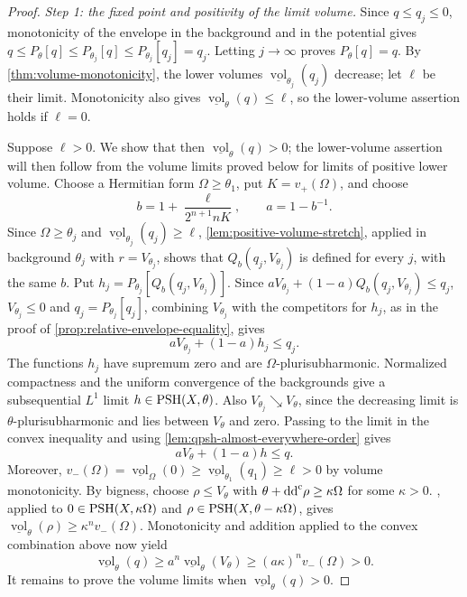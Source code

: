 \begin{proof}
\emph{Step 1: the fixed point and positivity of the limit volume.} Since $q\leq q_j\leq0$, monotonicity of the envelope in the background and in the potential gives $q\leq P_\theta[q]\leq P_{\theta_j}[q]\leq P_{\theta_j}[q_j]=q_j$. Letting $j\to\infty$ proves $P_\theta[q]=q$. By \cref{thm:volume-monotonicity}, the lower volumes $\underline{\operatorname{vol}}_{\theta_j}(q_j)$ decrease; let $\ell$ be their limit. Monotonicity also gives $\underline{\operatorname{vol}}_\theta(q)\leq\ell$, so the lower-volume assertion holds if $\ell=0$.

Suppose $\ell>0$. We show that then $\underline{\operatorname{vol}}_\theta(q)>0$; the lower-volume assertion will then follow from the volume limits proved below for limits of positive lower volume. Choose a Hermitian form $\Omega\geq\theta_1$, put $K=v_+(\Omega)$, and choose
\[
 b=1+\frac{\ell}{2^{n+1}nK},\qquad a=1-b^{-1}.
\]
Since $\Omega\geq\theta_j$ and $\underline{\operatorname{vol}}_{\theta_j}(q_j)\geq\ell$, \cref{lem:positive-volume-stretch}, applied in background $\theta_j$ with $r=V_{\theta_j}$, shows that $Q_b(q_j,V_{\theta_j})$ is defined for every $j$, with the same $b$. Put $h_j=P_{\theta_j}[Q_b(q_j,V_{\theta_j})]$. Since $aV_{\theta_j}+(1-a)Q_b(q_j,V_{\theta_j})\leq q_j$, $V_{\theta_j}\leq0$ and $q_j=P_{\theta_j}[q_j]$, combining $V_{\theta_j}$ with the competitors for $h_j$, as in the proof of \cref{prop:relative-envelope-equality}, gives
\[
 aV_{\theta_j}+(1-a)h_j\leq q_j.
\]
The functions $h_j$ have supremum zero and are $\Omega$-plurisubharmonic. Normalized compactness and the uniform convergence of the backgrounds give a subsequential $L^1$ limit $h\in\mathrm{PSH}(X,\theta)$. Also $V_{\theta_j}\searrow V_\theta$, since the decreasing limit is $\theta$-plurisubharmonic and lies between $V_\theta$ and zero. Passing to the limit in the convex inequality and using \cref{lem:qpsh-almost-everywhere-order} gives
\[
 aV_\theta+(1-a)h\leq q.
\]
Moreover, $v_-(\Omega)=\underline{\operatorname{vol}}_\Omega(0)\geq\underline{\operatorname{vol}}_{\theta_1}(q_1)\geq\ell>0$ by volume monotonicity. By bigness, choose $\rho\leq V_\theta$ with $\theta+\mathrm{dd}^{\mathrm{c}}\rho\geq\kappa\Omega$ for some $\kappa>0$. , applied to $0\in\mathrm{PSH}(X,\kappa\Omega)$ and $\rho\in\mathrm{PSH}(X,\theta-\kappa\Omega)$, gives $\underline{\operatorname{vol}}_\theta(\rho)\geq\kappa^n v_-(\Omega)$. Monotonicity and addition applied to the convex combination above now yield
\[
 \underline{\operatorname{vol}}_\theta(q)
 \geq a^n\underline{\operatorname{vol}}_\theta(V_\theta)
 \geq(a\kappa)^n v_-(\Omega)>0.
\]
It remains to prove the volume limits when $\underline{\operatorname{vol}}_\theta(q)>0$.


\end{proof}
